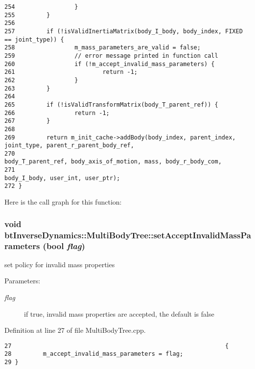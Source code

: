 \begin{Code}
\begin{verbatim}
254                 }
255         }
256 
257         if (!isValidInertiaMatrix(body_I_body, body_index, FIXED == joint_type)) {
258                 m_mass_parameters_are_valid = false;
259                 // error message printed in function call
260                 if (!m_accept_invalid_mass_parameters) {
261                         return -1;
262                 }
263         }
264 
265         if (!isValidTransformMatrix(body_T_parent_ref)) {
266                 return -1;
267         }
268 
269         return m_init_cache->addBody(body_index, parent_index, joint_type, parent_r_parent_body_ref,
270                                                                  body_T_parent_ref, body_axis_of_motion, mass, body_r_body_com,
271                                                                  body_I_body, user_int, user_ptr);
272 }
\end{verbatim}
\end{Code}




Here is the call graph for this function:\hypertarget{classbt_inverse_dynamics_1_1_multi_body_tree_5ba35645225ad53584dcd0908d26c8ea}{
\subsubsection[setAcceptInvalidMassParameters]{\setlength{\rightskip}{0pt plus 5cm}void btInverseDynamics::MultiBodyTree::setAcceptInvalidMassParameters (bool {\em flag})}}
\label{classbt_inverse_dynamics_1_1_multi_body_tree_5ba35645225ad53584dcd0908d26c8ea}


set policy for invalid mass properties \begin{Desc}
\item[Parameters:]
\begin{description}
\item[{\em flag}]if true, invalid mass properties are accepted, the default is false \end{description}
\end{Desc}


Definition at line 27 of file MultiBodyTree.cpp.

\begin{Code}\begin{verbatim}27                                                             {
28         m_accept_invalid_mass_parameters = flag;
29 }
\end{verbatim}
\end{Code}


